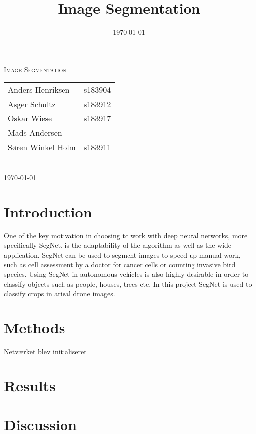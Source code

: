 \documentclass[12pt,fleqn]{article}
\title{Image Segmentation}
\author{}
\date{\today}
\begin{document}

\begin{titlepage}
	\begin{center}
		\textsc{\LARGE Image Segmentation}\\
		[1.0cm]
		{
		\large
		\begin{tabular}{lr}
			Anders Henriksen&s183904\\
			Asger Schultz&s183912\\
			Oskar Wiese&s183917\\
			Mads Andersen&\\
			Søren Winkel Holm&s183911
		\end{tabular}
		}\\
		[0.5cm]
		\textsc{\large \today}
	\end{center}
\end{titlepage}
\tableofcontents \newpage


\section{Introduction}
One of the key motivation in choosing to work with deep neural networks, more specifically
SegNet, is the adaptability of the algorithm as well as the wide application. SegNet can be
used to segment images to speed up manual work, such as cell assessment by a doctor for
cancer cells or counting invasive bird species. Using SegNet in autonomous vehicles is also
highly desirable in order to classify objects such as people, houses, trees etc. In this project SegNet is used to classify crops in arieal drone images. 

\section{Methods}
Netværket blev initialiseret

\section{Results}

\section{Discussion}
\end{document}
